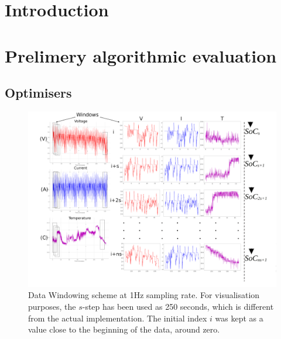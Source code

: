 \documentclass[journal]{IEEEtranTIE}
\begin{document}
%
{}


\section{Introduction} \label{sec:Introduction}

% 
\section{Prelimery algorithmic evaluation} \label{sec:Body}

    
    
    \subsection{Optimisers} \label{subsec:optimisers}
    
        
        
        
    
\begin{landscape}
    \begin{figure}[ht]
        \centering
        \includegraphics[width=\linewidth]{II_Body/images/windowing3f-A3.jpg}
        \caption{Data Windowing scheme at 1Hz sampling rate. For visualisation purposes, the $s$-step has been used as 250 seconds, which is different from the actual implementation. The initial index $i$ was kept as a value close to the beginning of the data, around zero.}
        \label{fig:Windowing3f}
    \end{figure}
\end{landscape}
\end{document}

